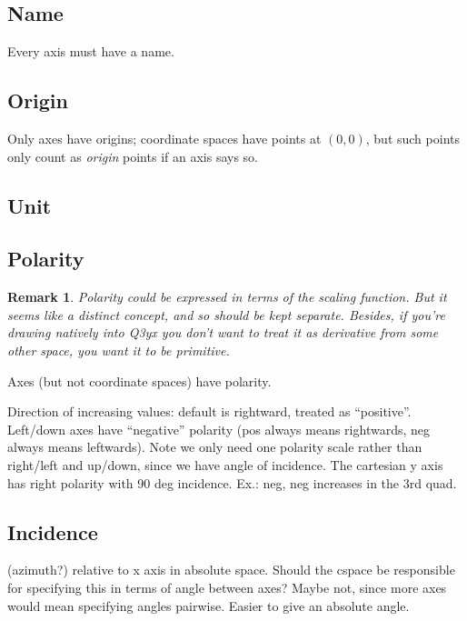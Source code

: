 \documentclass[12pt]{tufte-handout}
\numberwithin{equation}{subsection}
\numberwithin{equation}{subsection}
\newtheorem{remark}{Remark}
\newcommand\cspace{coordinate space}
\begin{document}
  \subsection{Name}
  \label{subs:axisname}

  Every axis must have a name.

  \subsection{Origin}
  \label{subs:axisorigin}

  Only axes have origins; \cspace{}s have points at \((0,0)\), but such
  points only count as \textit{origin} points if an axis says so.

  \subsection{Unit}
  \label{subs:axisunit}


  \subsection{Polarity}
  \label{subs:polarity}

  \begin{remark}
    Polarity could be expressed in terms of the scaling function.  But
    it seems like a distinct concept, and so should be kept separate.
    Besides, if you're drawing natively into Q3yx you don't want to
    treat it as derivative from some other space, you want it to be
    primitive.
  \end{remark}

  Axes (but not \cspace{}s) have polarity.

  Direction of increasing values: default is rightward, treated as
  ``positive''.  Left/down axes have ``negative'' polarity (pos always
  means rightwards, neg always means leftwards).  Note we only need one
  polarity scale rather than right/left and up/down, since we have angle
  of incidence.  The cartesian y axis has right polarity with 90 deg
  incidence.  Ex.: neg, neg increases in the 3rd quad.

  \subsection{Incidence}
  \label{subs:incidence}

  (azimuth?) relative to x axis in absolute space.
  Should the cspace be responsible for specifying this in terms of
  angle between axes?  Maybe not, since more axes would mean
  specifying angles pairwise.  Easier to give an absolute angle.
\end{document}
